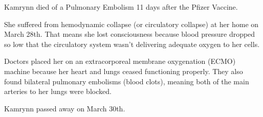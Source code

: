 Kamrynn died of a Pulmonary Embolism 11 days after the Pfizer Vaccine.

She suffered from hemodynamic collapse (or circulatory collapse) at her home on
March 28th. That means she lost consciousness because blood pressure dropped so
low that the circulatory system wasn’t delivering adequate oxygen to her cells.

Doctors placed her on an extracorporeal membrane oxygenation (ECMO) machine
because her heart and lungs ceased functioning properly. They also found
bilateral pulmonary embolisms (blood clots), meaning both of the main arteries
to her lungs were blocked.

Kamrynn passed away on March 30th.

